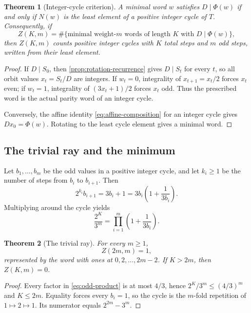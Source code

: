 \documentclass[11pt]{amsart}
\numberwithin{equation}{section}
\newtheorem{theorem}{Theorem}[section]
\begin{document}
\begin{theorem}[Integer-cycle criterion]\label{thm:integer-cycle-criterion}
A minimal word $w$ satisfies $D\mid\Phi(w)$ if and only if $N(w)$ is the least element of a positive integer cycle of $T$.  Consequently, if
\[
Z(K,m)=\#\{\text{minimal weight-$m$ words of length $K$ with }D\mid\Phi(w)\},
\]
then $Z(K,m)$ counts positive integer cycles with $K$ total steps and $m$ odd steps, written from their least element.
\end{theorem}

\begin{proof}
If $D\mid S_0$, then \cref{prop:rotation-recurrence} gives $D\mid S_t$ for every $t$, so all orbit values $x_t=S_t/D$ are integers.  If $w_t=0$, integrality of $x_{t+1}=x_t/2$ forces $x_t$ even; if $w_t=1$, integrality of $(3x_t+1)/2$ forces $x_t$ odd.  Thus the prescribed word is the actual parity word of an integer cycle.

Conversely, the affine identity \eqref{eq:affine-composition} for an integer cycle gives $D x_0=\Phi(w)$.  Rotating to the least cycle element gives a minimal word.
\end{proof}

\subsection{The trivial ray and the minimum}

Let $b_1,\ldots,b_m$ be the odd values in a positive integer cycle, and let $k_i\ge1$ be the number of steps from $b_i$ to $b_{i+1}$.  Then
\begin{equation}\label{eq:odd-product-local}
2^{k_i}b_{i+1}=3b_i+1
=3b_i\left(1+\frac1{3b_i}\right).
\end{equation}
Multiplying around the cycle yields
\begin{equation}\label{eq:odd-product}
\frac{2^K}{3^m}=\prod_{i=1}^m\left(1+\frac1{3b_i}\right).
\end{equation}

\begin{theorem}[The trivial ray]\label{thm:trivial-ray}
For every $m\ge1$,
\[
Z(2m,m)=1,
\]
represented by the word with ones at $0,2,\ldots,2m-2$.  If $K>2m$, then $Z(K,m)=0$.
\end{theorem}

\begin{proof}
Every factor in \eqref{eq:odd-product} is at most $4/3$, hence $2^K/3^m\le(4/3)^m$ and $K\le2m$.  Equality forces every $b_i=1$, so the cycle is the $m$-fold repetition of $1\mapsto2\mapsto1$.  Its numerator equals $2^{2m}-3^m$.
\end{proof}
\end{document}
